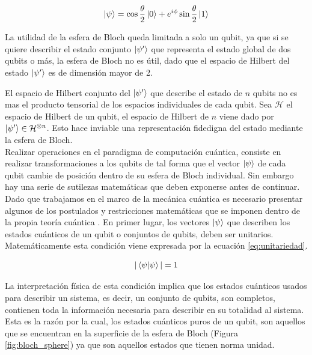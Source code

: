 \begin{equation}
    \ket{\psi} = \cos{\frac{\theta}{2}}\ket{0} + e^{i\phi}\sin{\frac{\theta}{2}}\ket{1}
    \label{eq:estado_bloch}
\end{equation}

La utilidad de la esfera de Bloch queda limitada a solo un qubit, ya que si se quiere describir el estado conjunto $\ket{\psi'}$ que representa el estado global de dos qubits o más, la esfera de Bloch no es útil, dado que el espacio de Hilbert del estado $\ket{\psi'}$ es de dimensión mayor de 2. 

\newpage

El espacio de Hilbert conjunto del $\ket{\psi'}$ que describe el estado de $n$ qubits no es mas el producto tensorial de los espacios individuales de cada qubit. Sea $\mathcal{H}$ el espacio de Hilbert de un qubit, el espacio de Hilbert de $n$ viene dado por $\ket{\psi'} \in \mathcal{H}^{\otimes n}$. Esto hace inviable una representación fidedigna del estado mediante la esfera de Bloch.\\

Realizar operaciones en el paradigma de computación cuántica, consiste en realizar transformaciones a los qubits de tal forma que el vector $\ket{\psi}$ de cada qubit cambie de posición dentro de su esfera de Bloch individual. Sin embargo hay una serie de sutilezas matemáticas que deben exponerse antes de continuar. \\

Dado que trabajamos en el marco de la mecánica cuántica es necesario presentar algunos de los postulados y restricciones matemáticas que se imponen dentro de la propia teoría cuántica \citep{cohen}. En primer lugar, los vectores $\ket{\psi}$ que describen los estados cuánticos de un qubit o conjuntos de qubits, deben ser unitarios. Matemáticamente esta condición viene expresada por la ecuación \ref{eq:unitariedad}. 

\begin{equation}
    |\braket{{\psi}|{\psi}}| = 1
    \label{eq:unitariedad}
\end{equation}

La interpretación física de esta condición implica que los estados cuánticos usados para describir un sistema, es decir, un conjunto de qubits, son completos, contienen toda la información necesaria para describir en su totalidad al sistema. Esta es la razón por la cual, los estados cuánticos puros de un qubit, son aquellos que se encuentran en la superficie de la esfera de Bloch (Figura \ref{fig:bloch_sphere}) ya que son aquellos estados que tienen norma unidad. \\

